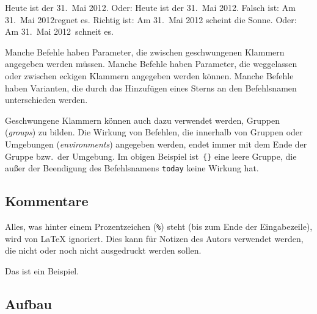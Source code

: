 \renewcommand{\today}{31.~Mai 2012}  %
\begin{LTXexample}
Heute ist der \today.
Oder: Heute ist der \today .
Falsch ist:
 Am \today regnet es.
Richtig ist:
 Am \today{} scheint die Sonne.
 Oder: Am \today\ schneit es.
\end{LTXexample}



Manche Befehle haben Parameter, die zwischen geschwungenen Klammern angegeben
werden müssen. Manche Befehle haben Parameter, die weggelassen oder zwischen
eckigen Klammern angegeben werden können. Manche Befehle haben Varianten, die
durch das Hinzufügen eines Sterns an den Befehlsnamen unterschieden werden.

Geschwungene Klammern können auch dazu verwendet werden, Gruppen (\emph{groups})
zu bilden. Die Wirkung von Befehlen, die innerhalb von Gruppen oder Umgebungen
(\emph{environments}) angegeben werden, endet immer mit dem Ende der Gruppe
bzw.\ der Umgebung.  Im obigen Beispiel ist~\lstinline|{}| eine leere Gruppe, die
außer der Beendigung des Befehlsnamens \texttt{today} keine Wirkung hat.

\subsection{Kommentare}

Alles, was hinter einem Prozentzeichen (\lstinline|%|) steht (bis zum Ende der
Eingabezeile), wird von \LaTeX{} ignoriert. Dies kann für Notizen des Autors
verwendet werden, die nicht oder noch nicht ausgedruckt werden sollen.
\begin{LTXexample}
Das ist ein %
Beispiel.
\end{LTXexample}

\subsection{Aufbau}

